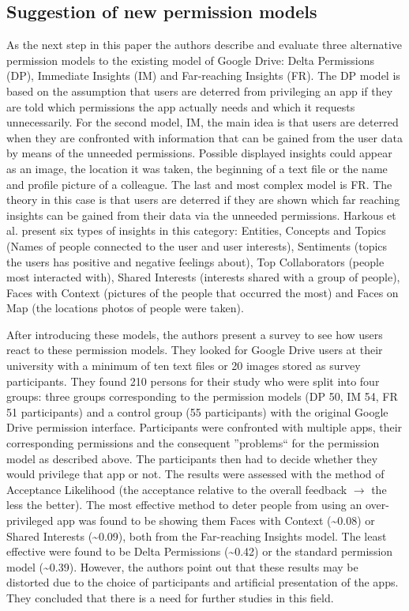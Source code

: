 \documentclass[11pt,twocolumn,a4paper,DIV=calc]{scrartcl}
\begin{document}
\subsection{Suggestion of new permission models}
As the next step in this paper the authors describe and evaluate three alternative permission models to the existing model of Google Drive: Delta Permissions (DP), Immediate Insights (IM) and Far-reaching Insights (FR). The DP model is based on the assumption that users are deterred from privileging an app if they are told which permissions the app actually needs and which it requests unnecessarily. For the second model, IM, the main idea is that users are deterred when they are confronted with information that can be gained from the user data by means of the unneeded permissions. Possible displayed insights could appear as an image, the location it was taken, the beginning of a text file or the name and profile picture of a colleague. The last and most complex model is FR. 
The theory in this case is that users are deterred if they are shown which far reaching insights can be gained from their data via the unneeded permissions. 
Harkous et al. present six types of insights in this category: Entities, Concepts and Topics (Names of people connected to the user and user interests), Sentiments (topics the users has positive and negative feelings about), Top Collaborators (people most interacted with), Shared Interests (interests shared with a group of people), Faces with Context (pictures of the people that occurred the most) and Faces on Map (the locations photos of people were taken).

After introducing these models, the authors present a survey to see how users react to these permission models. They looked for Google Drive users at their university with a minimum of ten text files or 20 images stored as survey participants. They found 210 persons for their study who were split into four groups: three groups corresponding to the permission models (DP 50, IM 54, FR 51 participants) and a control group (55 participants) with the original Google Drive permission interface. Participants were confronted with multiple apps, their corresponding permissions and the consequent ''problems`` for the permission model as described above. The participants then had to decide whether they would privilege that app or not. The results were assessed with the method of Acceptance Likelihood (the acceptance relative to the overall feedback $\rightarrow$ the less the better). The most effective method to deter people from using an over-privileged app was found to be showing them Faces with Context (\textasciitilde 0.08) or Shared Interests (\textasciitilde 0.09), both from the Far-reaching Insights model. The least effective were found to be Delta Permissions (\textasciitilde 0.42) or the standard permission model (\textasciitilde 0.39). However, the authors point out that these results may be distorted due to the choice of participants and artificial presentation of the apps. They concluded that there is a need for further studies in this field.
\end{document}
